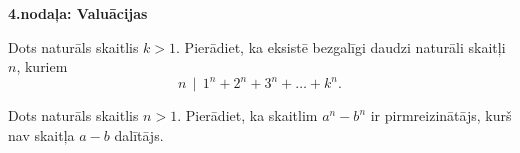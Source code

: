 \documentclass[11pt]{article}
\begin{document}
\vspace{10pt}
{\bf \large 4.nodaļa: Valuācijas}

\begin{problem}
Dots naturāls skaitlis $k > 1$. Pierādiet, ka eksistē bezgalīgi daudzi naturāli skaitļi $n$, kuriem 
$$n \,\mid\, 1^n + 2^n + 3^n + \ldots + k^n.$$
\end{problem}

\begin{problem}
Dots naturāls skaitlis $n > 1$.
Pierādiet, ka skaitlim $a^n - b^n$ ir pirmreizinātājs, kurš nav skaitļa $a-b$ dalītājs.
\end{problem}
\end{document}
